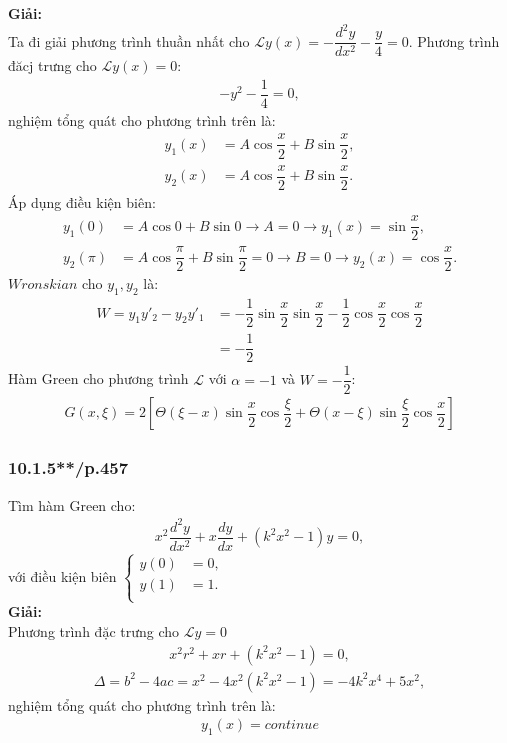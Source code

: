 \documentclass{report}
\newcommand{\f}[2]{\dfrac{#1}{#2}}
\begin{document}
\textbf{Giải:}\\
Ta đi giải phương trình thuần nhất cho $\mathcal{L} y(x) = -\dfrac{d^2 y}{dx^2} - \dfrac{y}{4}  = 0$. Phương trình đăcj trưng cho $\mathcal{L} y(x) = 0:$
\begin{align*}
	-y^2 - \dfrac{1}{4} = 0,
\end{align*}
nghiệm tổng quát cho phương trình trên là:
\begin{align*}
	y_{1}(x) & = A \cos \f{x}{2} + B \sin \f{x}{2}, \\
	y_{2}(x) & = A \cos \f{x}{2} + B \sin \f{x}{2}.
\end{align*}
Áp dụng điều kiện biên:
\begin{align*}
	y_{1}(0)   & = A \cos 0 + B \sin 0 \rightarrow A = 0 \rightarrow y_{1}(x) = \sin \f{x}{2},                     \\
	y_{2}(\pi) & = A \cos \f{\pi}{2} + B \sin \f{\pi}{2} = 0 \rightarrow B = 0 \rightarrow y_2(x) = \cos \f{x}{2}.
\end{align*}
$Wronskian$ cho $y_1,y_2$ là:
\begin{align*}
	W = y_1 y'_2 - y_2 y'_1
	 & = -\f{1}{2} \sin \f{x}{2} \sin \f{x}{2} - \f{1}{2} \cos \f{x}{2} \cos \f{x}{2} \\
	 & = -\f{1}{2}
\end{align*}
Hàm Green cho phương trình $\mathcal{L}$ với $\alpha = - 1$ và $ W = -\f{1}{2}$:
\begin{align*}
	G(x,\xi) = 2 \left[ \Theta(\xi - x) \sin \f{x}{2} \cos \f{\xi}{2} + \Theta(x-\xi) \sin \f{\xi}{2} \cos \f{x}{2} \right]
\end{align*}
\subsubsection{10.1.5**/p.457}
Tìm hàm Green cho:
\begin{align*}
	x^2 \f{d^2y}{dx^2} + x \f{dy}{dx} + \left(k^2 x^2 - 1\right)y = 0,
\end{align*}
với điều kiện biên
$
	\begin{cases}
		y(0) & = 0, \\
		y(1) & = 1. \\
	\end{cases}
$\\

\textbf{Giải:}\\
Phương trình đặc trưng cho $\mathcal{L} y = 0$
\begin{align*}
	x^2 r^2 + x r + (k^2 x^2 - 1) = 0,
\end{align*}
\begin{align*}
	\Delta = b^2 - 4 a c = x^2 - 4 x^2 (k^2 x^2 - 1) = -4 k^2 x^4 + 5x^2  ,
\end{align*}
nghiệm tổng quát cho phương trình trên là:
\begin{align*}
	y_1 (x) = continue
\end{align*}
\end{document}
